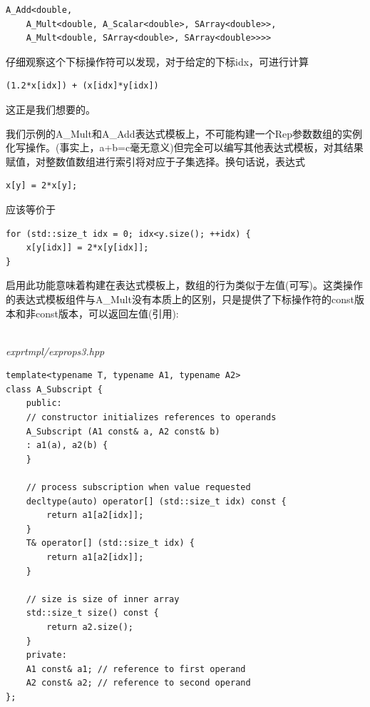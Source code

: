 \begin{lstlisting}[style=styleCXX]
A_Add<double,
	A_Mult<double, A_Scalar<double>, SArray<double>>,
	A_Mult<double, SArray<double>, SArray<double>>>>
\end{lstlisting}

仔细观察这个下标操作符可以发现，对于给定的下标idx，可进行计算

\begin{lstlisting}[style=styleCXX]
(1.2*x[idx]) + (x[idx]*y[idx])
\end{lstlisting}

这正是我们想要的。


我们示例的A\_Mult和A\_Add表达式模板上，不可能构建一个Rep参数数组的实例化写操作。(事实上，a+b=c毫无意义)但完全可以编写其他表达式模板，对其结果赋值，对整数值数组进行索引将对应于子集选择。换句话说，表达式

\begin{lstlisting}[style=styleCXX]
x[y] = 2*x[y];
\end{lstlisting}

应该等价于

\begin{lstlisting}[style=styleCXX]
for (std::size_t idx = 0; idx<y.size(); ++idx) {
	x[y[idx]] = 2*x[y[idx]];
}
\end{lstlisting}

启用此功能意味着构建在表达式模板上，数组的行为类似于左值(可写)。这类操作的表达式模板组件与A\_Mult没有本质上的区别，只是提供了下标操作符的const版本和非const版本，可以返回左值(引用):

\hspace*{\fill} \\ %
\noindent
\textit{exprtmpl/exprops3.hpp}
\begin{lstlisting}[style=styleCXX]
template<typename T, typename A1, typename A2>
class A_Subscript {
	public:
	// constructor initializes references to operands
	A_Subscript (A1 const& a, A2 const& b)
	: a1(a), a2(b) {
	}

	// process subscription when value requested
	decltype(auto) operator[] (std::size_t idx) const {
		return a1[a2[idx]];
	}
	T& operator[] (std::size_t idx) {
		return a1[a2[idx]];
	}

	// size is size of inner array
	std::size_t size() const {
		return a2.size();
	}
	private:
	A1 const& a1; // reference to first operand
	A2 const& a2; // reference to second operand
};
\end{lstlisting}


